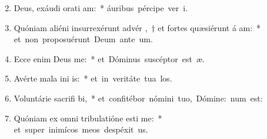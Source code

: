 \begin{flushleft}
\begin{enumerate}[leftmargin=*]
\setcounter{enumi}{1}

\item Deus, exáudi orati am:~* \mbox{áuribus pércipe ver  i.}
\item Quóniam aliéni insurrexérunt advér ,~† et fortes quæsiérunt á am:~* \mbox{et non proposuérunt Deum ante  um.}
\item Ecce enim Deus  me:~* \mbox{et Dóminus suscéptor est  æ.}
\item Avérte mala ini is:~* \mbox{et in veritáte tua  los.}
\item Voluntárie sacrifi bi,~* \mbox{et confitébor nómini tuo, Dómine:  num est:}
\item Quóniam ex omni tribulatióne esti me:~* \mbox{et super inimícos meos despéxit  us.}

\end{enumerate}
\end{flushleft}

